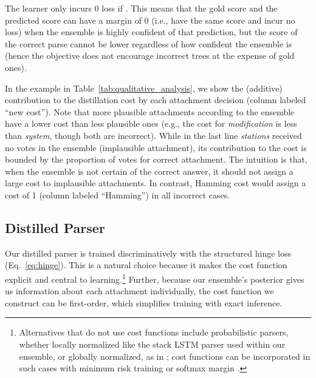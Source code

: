 \documentclass[11pt,letterpaper]{article}
\newcommand{\ignore}[1]{}
\newcommand{\nascomment}[1]{\ignore{\textcolor{blue}{{\textbf{[#1 --\textsc{nas}]}}}}}
\begin{document}
The learner only incurs 0 loss if . This means that the gold score and the predicted score can have a margin of 0 (i.e., have the same score and incur no loss) when the ensemble is highly confident of that prediction, but the score of the correct parse cannot be lower regardless of how confident the ensemble is (hence the objective does not encourage incorrect trees at the expense of gold ones).




\ignore{\nascomment{I've removed claims about overfitting; I don't think that's the right way to motivate differentiating different types of errors}}

In the example in Table~\ref{tab:qualitative_analysis}, we show the (additive) contribution to the distillation cost by each attachment decision (column labeled ``new cost'').  Note that more plausible attachments according to the ensemble have a lower cost than less plausible ones (e.g., the cost for \emph{modification} is less than \emph{system}, though both are incorrect). While in the last line \emph{stations} received no votes in the ensemble (implausible attachment), its contribution to the cost is bounded by the proportion of votes for correct attachment. The intuition is that, when the ensemble is not certain of the correct answer, it should not assign a large cost to implausible attachments. In contrast, Hamming cost would assign a cost of 1 (column labeled ``Hamming'') in all incorrect cases.


















\subsection{Distilled Parser}
Our distilled parser is trained  discriminatively with the structured hinge loss (Eq.~\ref{eq:hinge}).  This is a natural choice because it makes the cost function explicit and central to learning.\footnote{Alternatives that do not use cost functions include probabilistic parsers, whether locally normalized like the stack LSTM parser used within our ensemble, or globally normalized, as in ; cost functions can be incorporated in such cases with minimum risk training \cite{smith-eisner:2006:POS} or softmax margin \cite{gimpel2010softmax}.}  Further, because our ensemble's posterior
gives us information about each attachment individually, the cost function we construct can be first-order, which simplifies training with exact inference.  
\end{document}
